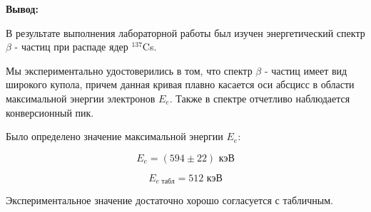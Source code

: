 \documentclass[a4paper, 12pt]{article}%
\begin{document}
\textbf{Вывод:}\\\par

	В результате выполнения лабораторной работы был изучен энергетический спектр $\beta$ - частиц при распаде ядер $^{137}$Cs.  
	
	Мы экспериментально удостоверились в том,  что спектр $\beta$ - частиц имеет вид широкого купола,  причем данная кривая плавно касается оси абсцисс в области максимальной энергии электронов $E_e$. Также в спектре отчетливо наблюдается конверсионный пик.
	
	Было определено значение максимальной энергии $E_e$:
	
	\[E_e = (594 \pm 22) \text{ кэВ}\]
	
	\[E_{e\text{ табл}} = 512 \text{ кэВ}\]
	
	 Экспериментальное значение достаточно хорошо согласуется с табличным.
\end{document}
